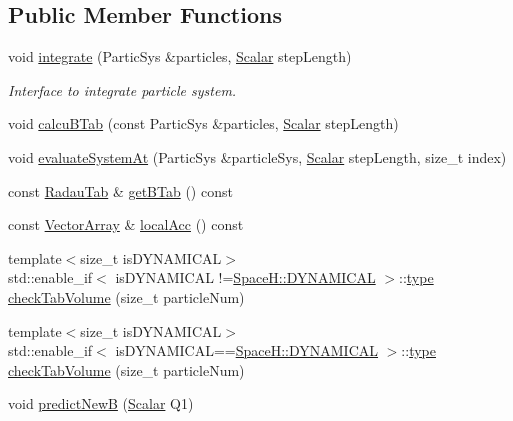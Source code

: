 \subsection*{Public Member Functions}
\begin{DoxyCompactItemize}
\item 
void \mbox{\hyperlink{class_space_h_1_1_gauss_dadau_a5ce29f965ea0376d9fb3fddf116926b1}{integrate}} (Partic\+Sys \&particles, \mbox{\hyperlink{class_space_h_1_1_gauss_dadau_ace42540e9fb47d7f1d1f00622bbd1ccb}{Scalar}} step\+Length)
\begin{DoxyCompactList}\small\item\em Interface to integrate particle system. \end{DoxyCompactList}\item 
void \mbox{\hyperlink{class_space_h_1_1_gauss_dadau_ac7089493b28c3c3ed67dc875e172b40c}{calcu\+B\+Tab}} (const Partic\+Sys \&particles, \mbox{\hyperlink{class_space_h_1_1_gauss_dadau_ace42540e9fb47d7f1d1f00622bbd1ccb}{Scalar}} step\+Length)
\item 
void \mbox{\hyperlink{class_space_h_1_1_gauss_dadau_a135095dd4f33570045a327dec46e6840}{evaluate\+System\+At}} (Partic\+Sys \&particle\+Sys, \mbox{\hyperlink{class_space_h_1_1_gauss_dadau_ace42540e9fb47d7f1d1f00622bbd1ccb}{Scalar}} step\+Length, size\+\_\+t index)
\item 
const \mbox{\hyperlink{class_space_h_1_1_gauss_dadau_aa191c67a1447ce70b7ec2dae6b061176}{Radau\+Tab}} \& \mbox{\hyperlink{class_space_h_1_1_gauss_dadau_acd80e3ae759660e91227ff4c83da01f1}{get\+B\+Tab}} () const
\item 
const \mbox{\hyperlink{class_space_h_1_1_gauss_dadau_a69e00c49f96f4ffeeb767bb7222834da}{Vector\+Array}} \& \mbox{\hyperlink{class_space_h_1_1_gauss_dadau_a9e89b65584577e684033159d85aa1a9f}{local\+Acc}} () const
\item 
{\footnotesize template$<$size\+\_\+t is\+D\+Y\+N\+A\+M\+I\+C\+AL$>$ }\\std\+::enable\+\_\+if$<$ is\+D\+Y\+N\+A\+M\+I\+C\+AL !=\mbox{\hyperlink{namespace_space_h_a3e55b9bc2a9e10c08ce8121bce11244a}{Space\+H\+::\+D\+Y\+N\+A\+M\+I\+C\+AL}} $>$\+::\mbox{\hyperlink{class_space_h_1_1_gauss_dadau_a780629d19a82feeab959cd68c8a5f8a3}{type}} \mbox{\hyperlink{class_space_h_1_1_gauss_dadau_a0e5f1df629baf9e5dfdfa052544c68ff}{check\+Tab\+Volume}} (size\+\_\+t particle\+Num)
\item 
{\footnotesize template$<$size\+\_\+t is\+D\+Y\+N\+A\+M\+I\+C\+AL$>$ }\\std\+::enable\+\_\+if$<$ is\+D\+Y\+N\+A\+M\+I\+C\+AL==\mbox{\hyperlink{namespace_space_h_a3e55b9bc2a9e10c08ce8121bce11244a}{Space\+H\+::\+D\+Y\+N\+A\+M\+I\+C\+AL}} $>$\+::\mbox{\hyperlink{class_space_h_1_1_gauss_dadau_a780629d19a82feeab959cd68c8a5f8a3}{type}} \mbox{\hyperlink{class_space_h_1_1_gauss_dadau_acd04be9569a1426f923714b6086598a5}{check\+Tab\+Volume}} (size\+\_\+t particle\+Num)
\item 
void \mbox{\hyperlink{class_space_h_1_1_gauss_dadau_a7669fef19d9982793fc4f4bbd49ad650}{predict\+NewB}} (\mbox{\hyperlink{class_space_h_1_1_gauss_dadau_ace42540e9fb47d7f1d1f00622bbd1ccb}{Scalar}} Q1)
\end{DoxyCompactItemize}
